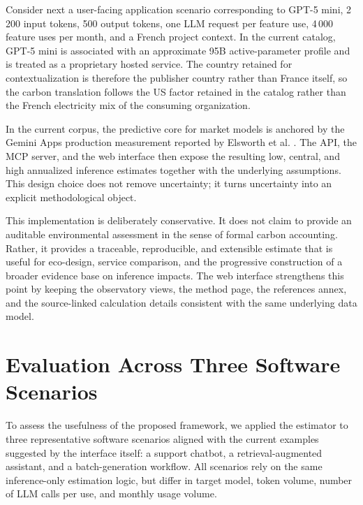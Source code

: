 \documentclass[11pt,a4paper]{article}
\begin{document}
Consider next a user-facing application scenario corresponding to GPT-5 mini, 2\,200 input tokens, 500 output tokens, one LLM request per feature use, 4\,000 feature uses per month, and a French project context. In the current catalog, GPT-5 mini is associated with an approximate 95B active-parameter profile and is treated as a proprietary hosted service. The country retained for contextualization is therefore the publisher country rather than France itself, so the carbon translation follows the US factor retained in the catalog rather than the French electricity mix of the consuming organization.

In the current corpus, the predictive core for market models is anchored by the Gemini Apps production measurement reported by Elsworth et al. \cite{elsworth2025}. The API, the MCP server, and the web interface then expose the resulting low, central, and high annualized inference estimates together with the underlying assumptions. This design choice does not remove uncertainty; it turns uncertainty into an explicit methodological object.

This implementation is deliberately conservative. It does not claim to provide an auditable environmental assessment in the sense of formal carbon accounting. Rather, it provides a traceable, reproducible, and extensible estimate that is useful for eco-design, service comparison, and the progressive construction of a broader evidence base on inference impacts. The web interface strengthens this point by keeping the observatory views, the method page, the references annex, and the source-linked calculation details consistent with the same underlying data model.

\section{Evaluation Across Three Software Scenarios}
To assess the usefulness of the proposed framework, we applied the estimator to three representative software scenarios aligned with the current examples suggested by the interface itself: a support chatbot, a retrieval-augmented assistant, and a batch-generation workflow. All scenarios rely on the same inference-only estimation logic, but differ in target model, token volume, number of LLM calls per use, and monthly usage volume.
\end{document}
